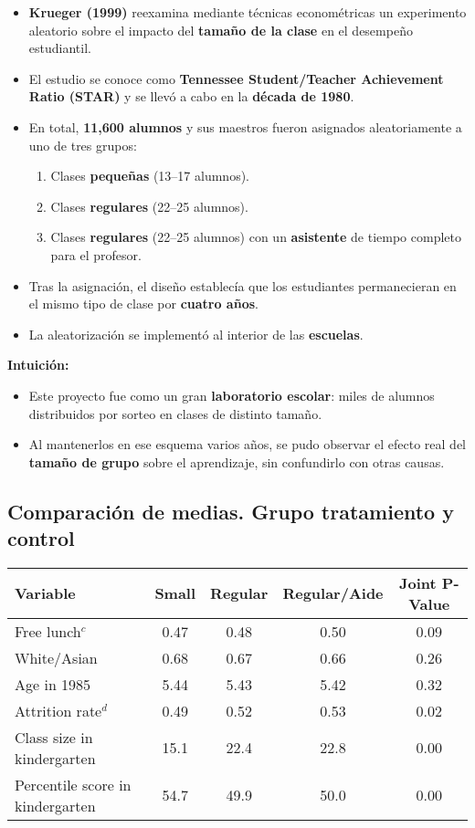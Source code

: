 \documentclass[12pt]{article}
\begin{document}
\begin{itemize}
    \item \textbf{Krueger (1999)} reexamina mediante técnicas econométricas un experimento aleatorio sobre el impacto del \textbf{tamaño de la clase} en el desempeño estudiantil.
    \item El estudio se conoce como \textbf{Tennessee Student/Teacher Achievement Ratio (STAR)} y se llevó a cabo en la \textbf{década de 1980}.
    \item En total, \textbf{11,600 alumnos} y sus maestros fueron asignados aleatoriamente a uno de tres grupos:
    \begin{enumerate}
        \item Clases \textbf{pequeñas} (13–17 alumnos).
        \item Clases \textbf{regulares} (22–25 alumnos).
        \item Clases \textbf{regulares} (22–25 alumnos) con un \textbf{asistente} de tiempo completo para el profesor.
    \end{enumerate}
    \item Tras la asignación, el diseño establecía que los estudiantes permanecieran en el mismo tipo de clase por \textbf{cuatro años}.
    \item La aleatorización se implementó al interior de las \textbf{escuelas}.
\end{itemize}

\textbf{Intuición:}
\begin{itemize}
    \item Este proyecto fue como un gran \textbf{laboratorio escolar}: miles de alumnos distribuidos por sorteo en clases de distinto tamaño.
    \item Al mantenerlos en ese esquema varios años, se pudo observar el efecto real del \textbf{tamaño de grupo} sobre el aprendizaje, sin confundirlo con otras causas.
\end{itemize}

\subsection*{\noindent\textbf{Comparación de medias. Grupo tratamiento y control}}

\begin{table}[H]
\centering
\begin{tabular}{lcccc}
\textbf{Variable} & \textbf{Small} & \textbf{Regular} & \textbf{Regular/Aide} & \textbf{Joint P-Value} \\
\hline
Free lunch$^c$ & 0.47 & 0.48 & 0.50 & 0.09 \\
White/Asian & 0.68 & 0.67 & 0.66 & 0.26 \\
Age in 1985 & 5.44 & 5.43 & 5.42 & 0.32 \\
Attrition rate$^d$ & 0.49 & 0.52 & 0.53 & 0.02 \\
Class size in kindergarten & 15.1 & 22.4 & 22.8 & 0.00 \\
Percentile score in kindergarten & 54.7 & 49.9 & 50.0 & 0.00 \\
\end{tabular}
\end{table}
\end{document}
